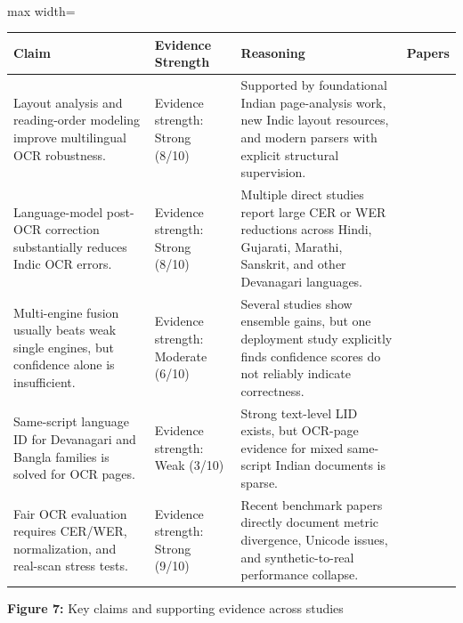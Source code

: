     
    \mbox{}\\
    \begin{adjustbox}{max width=\textwidth}
    \begin{tabular}{p{4.0cm} | p{4.0cm} | p{4.0cm} | p{4.0cm}}
    \hline
    Claim & Evidence Strength & Reasoning & Papers \\
    \hline
    Layout analysis and reading-order modeling improve multilingual OCR robustness. & Evidence strength: Strong (8/10) & Supported by foundational Indian page-analysis work, new Indic layout resources, and modern parsers with explicit structural supervision. & \cite{Chaudhuri2002Page} \cite{Nath2025IndicDLP:} \cite{Yang2025dots.ocr:} \cite{Li2026Structure-Aware} \\
    Language-model post-OCR correction substantially reduces Indic OCR errors. & Evidence strength: Strong (8/10) & Multiple direct studies report large CER or WER reductions across Hindi, Gujarati, Marathi, Sanskrit, and other Devanagari languages. & \cite{Bhandari2026A} \cite{Maheshwari2022A} \cite{Kashid2024RoundTripOCR:} \cite{Saluja2017Error} \\
    Multi-engine fusion usually beats weak single engines, but confidence alone is insufficient. & Evidence strength: Moderate (6/10) & Several studies show ensemble gains, but one deployment study explicitly finds confidence scores do not reliably indicate correctness. & \cite{Zilani2026A} \cite{Jhala2026PragyaDoc:} \cite{Saluja2017A} \\
    Same-script language ID for Devanagari and Bangla families is solved for OCR pages. & Evidence strength: Weak (3/10) & Strong text-level LID exists, but OCR-page evidence for mixed same-script Indian documents is sparse. & \cite{Manukonda2025byteSizedLLM@NLU} \cite{Madhani2023Bhasa-Abhijnaanam:} \cite{Sarungbam2014Script} \\
    Fair OCR evaluation requires CER/WER, normalization, and real-scan stress tests. & Evidence strength: Strong (9/10) & Recent benchmark papers directly document metric divergence, Unicode issues, and synthetic-to-real performance collapse. & \cite{Sivashanth2026Comprehensive} \cite{Jayatilleke2025Zero-shot} \cite{Singh2026Can} \cite{Caravani2026Assessing} \\
    \hline
    \end{tabular}
    \end{adjustbox}
    
    
    \textbf{Figure 7:} Key claims and supporting evidence across studies
    
